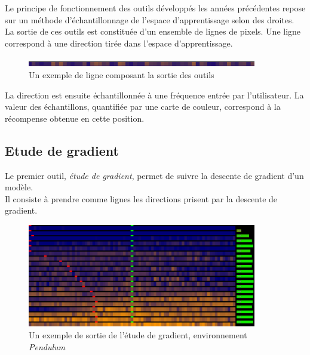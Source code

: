 \documentclass[12pt]{article}
\begin{document}
Le principe de fonctionnement des outils développés les années précédentes repose sur un méthode d’échantillonnage de l’espace d’apprentissage selon des droites. \\

La sortie de ces outils est constituée d’un ensemble de lignes de pixels. Une ligne correspond à une direction tirée dans l’espace d’apprentissage. \\

\begin{figure}[htp]
    \centering
    \includegraphics[width=10cm]{Images/Ligne}
    \caption{Un exemple de ligne composant la sortie des outils}
    \label{fig:ligne1}
\end{figure}

La direction est ensuite échantillonnée à une fréquence entrée par l’utilisateur. La valeur des échantillons, quantifiée par une carte de couleur, correspond à la récompense obtenue en cette position. \\

\subsection{Etude de gradient}

Le premier outil, \emph{étude de gradient}, permet de suivre la descente de gradient d’un modèle. \\

Il consiste à prendre comme lignes les directions prisent par la descente de gradient. \\

\begin{figure}[htp]
    \centering
    \includegraphics[width=10cm]{Images/gradientStudy}
    \caption{Un exemple de sortie de l'étude de gradient, environnement \emph{Pendulum}}
    \label{fig:gradientStudy}
\end{figure}
\end{document}
